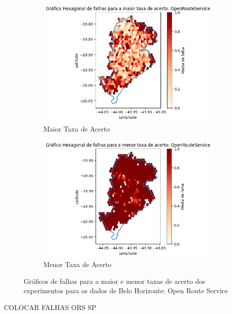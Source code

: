 \begin{figure}[ht]
  \centering
  \begin{subfigure}[b]{0.45\textwidth}
    \includegraphics[width=\textwidth]{Figuras/expFalhasORSmaior.png}
    \caption{Maior Taxa de Acerto}
    \label{fig:falhasorsBHexpMaior}
  \end{subfigure}
  \hfill
  \begin{subfigure}[b]{0.45\textwidth}
    \includegraphics[width=\textwidth]{Figuras/expFalhasORSmenor.png}
    \caption{Menor Taxa de Acerto}
    \label{fig:falhasorsBHexpMenor}
  \end{subfigure}
  
  \caption{Gráficos de falhas para a maior e menor taxas de acerto dos experimentos para os dados de Belo Horizonte: Open Route Service}
  \label{fig:falhas-exp-ors-bh}
\end{figure}

COLOCAR FALHAS ORS SP